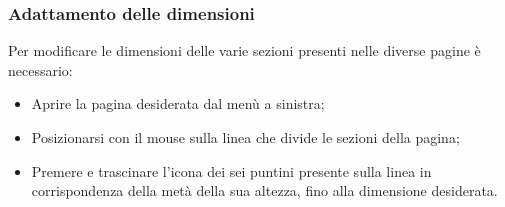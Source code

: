 \documentclass[10pt, a4paper]{article}
\begin{document}
\subsubsection{Adattamento delle dimensioni}
Per modificare le dimensioni delle varie sezioni presenti nelle diverse pagine è necessario:
\begin{itemize}
    \item Aprire la pagina desiderata dal menù a sinistra;
    \item Posizionarsi con il mouse sulla linea che divide le sezioni della pagina;
    \item Premere e trascinare l'icona dei sei puntini presente sulla linea in corrispondenza della metà della sua altezza, fino alla dimensione desiderata.
\end{itemize}
\end{document}
